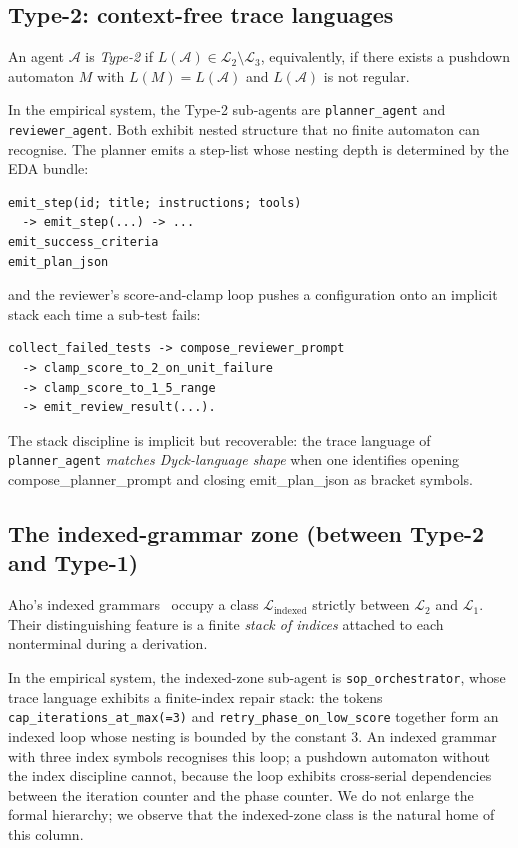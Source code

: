 \subsection{Type-2: context-free trace languages}

\begin{definition}
\label{def:type2agent}
An agent $\mathcal{A}$ is \emph{Type-2} if $L(\mathcal{A}) \in
\mathcal{L}_2 \setminus \mathcal{L}_3$, equivalently, if there
exists a pushdown automaton $M$ with $L(M) = L(\mathcal{A})$ and
$L(\mathcal{A})$ is not regular.
\end{definition}

In the empirical system, the Type-2 sub-agents are
\texttt{planner\_agent} and \texttt{reviewer\_agent}.  Both
exhibit nested structure that no finite automaton can recognise.
The planner emits a step-list whose nesting depth is determined
by the EDA bundle:
\begin{verbatim}
emit_step(id; title; instructions; tools)
  -> emit_step(...) -> ...
emit_success_criteria
emit_plan_json
\end{verbatim}
and the reviewer's score-and-clamp loop pushes a configuration
onto an implicit stack each time a sub-test fails:
\begin{verbatim}
collect_failed_tests -> compose_reviewer_prompt
  -> clamp_score_to_2_on_unit_failure
  -> clamp_score_to_1_5_range
  -> emit_review_result(...).
\end{verbatim}
The stack discipline is implicit but recoverable: the trace
language of \texttt{planner\_agent} \emph{matches Dyck-language
shape} \cite{hopcroft2006automata} when one identifies opening
\textsf{compose\_planner\_prompt} and closing
\textsf{emit\_plan\_json} as bracket symbols.

\subsection{The indexed-grammar zone (between Type-2 and Type-1)}

Aho's indexed grammars~\cite{aho1968indexed} occupy a class
$\mathcal{L}_{\mathrm{indexed}}$ strictly between $\mathcal{L}_2$
and $\mathcal{L}_1$.  Their distinguishing feature is a finite
\emph{stack of indices} attached to each nonterminal during a
derivation.

In the empirical system, the indexed-zone sub-agent is
\texttt{sop\_orchestrator}, whose trace language exhibits a
finite-index repair stack: the tokens
\texttt{cap\_iterations\_at\_max(=3)} and
\texttt{retry\_phase\_on\_low\_score} together form an indexed
loop whose nesting is bounded by the constant 3.  An indexed
grammar with three index symbols recognises this loop; a pushdown
automaton without the index discipline cannot, because the loop
exhibits cross-serial dependencies between the iteration counter
and the phase counter.  We do not enlarge the formal hierarchy;
we observe that the indexed-zone class is the natural home of
this column.

